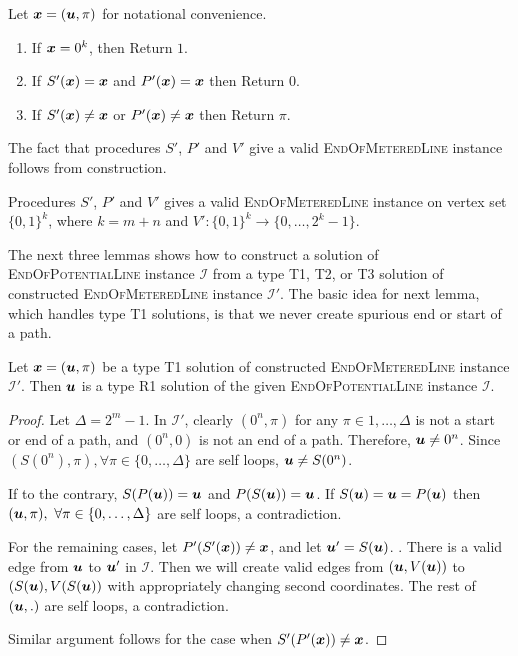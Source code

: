 \documentclass[a4paper,UKenglish]{lipics2}
\theoremstyle{definition}
\newcommand{\ra}{\rightarrow}
\def\problem#1{\textsc{#1}}
\def\EOPL{\problem{EndOfPotentialLine}\xspace}
\def\EOML{\problem{EndOfMeteredLine}\xspace}
\newcommand{\CI}{\mbox{${\mathcal I}$}}
\newcommand{\uu}{\mbox{\boldmath $u$}}
\newcommand{\xx}{\mbox{\boldmath $x$}}
\begin{document}
\noindent{\bf Procedure $V'(\uu,\pi)$.} Let $\xx=(\uu,\pi)$ for notational convenience.
\vspace{-0.2cm}

\begin{enumerate}
\item If $\xx=0^k$, then Return $1$. 
\item If $S'(\xx) = \xx$ and $P'(\xx)=\xx$ then Return $0$.
\item If $S'(\xx) \neq \xx$ or $P'(\xx)\neq \xx$ then Return $\pi$.
\end{enumerate}

The fact that procedures $S'$, $P'$ and $V'$ give a valid \EOML instance follows from construction.
\begin{lemma}\label{lem:p2m-valid}
Procedures $S'$, $P'$ and $V'$ gives a valid \EOML instance on vertex set $\{0,1\}^k$, where $k=m+n$ and $V':\{0,1\}^k\ra \{0,\dots, 2^k-1\}$.
\end{lemma}

The next three lemmas shows how to construct a solution of \EOPL instance $\CI$ from a type T1, T2, or T3 solution of constructed \EOML instance $\CI'$.
The basic idea for next lemma, which handles type T1 solutions, is that we never create spurious end or start of a path. 
\begin{lemma}\label{lem:p2m-t1}
Let $\xx=(\uu,\pi)$ be a type T1 solution of constructed \EOML instance $\CI'$. Then $\uu$ is a type R1 solution of the given \EOPL instance $\CI$.
\end{lemma}

\begin{proof}
Let $\Delta=2^m-1$.
In $\CI'$, clearly $(0^n,\pi)$ for any $\pi \in {1,\dots, \Delta}$ is not a start or end of a path, and $(0^n,0)$ is not an end of a path. Therefore, $\uu\neq 0^n$. Since $(S(0^n),\pi), \forall \pi\in \{0,\dots,\Delta\}$ are self loops, $\uu \neq S(0^n)$.

If to the contrary, $S(P(\uu))=\uu$ and $P(S(\uu))=\uu$. If $S(\uu)=\uu=P(\uu)$ then $(\uu,\pi),\ \forall \pi\in\{0,\dots,\Delta\}$ are self loops, a contradiction. 

For the remaining cases, let $P'(S'(\xx))\neq \xx$, and let $\uu'=S(\uu)$. . There is a valid edge from $\uu$ to $\uu'$ in $\CI$. Then we will create valid edges from $(\uu,V(\uu))$ to $(S(\uu),V(S(\uu))$ with appropriately changing second coordinates. The rest of $(\uu,.)$ are self loops, a contradiction. 

Similar argument follows for the case when $S'(P'(\xx))\neq \xx$. 
\end{proof}
\end{document}
